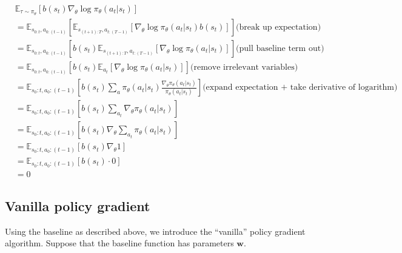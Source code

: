 \documentclass{article}
\newcommand{\E}{\mathbb{E}}                                        %
\newcommand{\w}{\mathbf{w}}
\begin{document}
\begin{align*}
&\E_{\tau \sim \pi_\theta} [b(s_t) \nabla_\theta \log \pi_\theta(a_t | s_t) ] \\
&= \E_{s_{0:t},a_{0:(t-1)}} \left[ \E_{s_{(t+1):T},a_{t:(T-1)}} [ \nabla_\theta \log \pi_\theta(a_t | s_t) b(s_t)] \right] \text{(break up expectation)} \\
&= \E_{s_{0:t},a_{0:(t-1)}} \left[ b(s_t) \E_{s_{(t+1):T},a_{t:(T-1)}} [ \nabla_\theta \log \pi_\theta(a_t | s_t)] \right] \text{(pull baseline term out)} \\
&= \E_{s_{0:t},a_{0:(t-1)}} \left[ b(s_t) \E_{a_t} [ \nabla_\theta \log \pi_\theta(a_t | s_t)] \right] \text{(remove irrelevant variables)} \\
&= \E_{s_0:t,a_0:(t-1)} \left[ b(s_t) \sum_a \pi_\theta(a_t | s_t) \frac{\nabla_\theta \pi_\theta(a_t | s_t)}{\pi_\theta(a_t | s_t)} \right] \text{(expand expectation + take derivative of logarithm)} \\
&= \E_{s_0:t,a_0:(t-1)} \left[ b(s_t) \sum_{a_t} \nabla_\theta \pi_\theta(a_t | s_t) \right] \\
&= \E_{s_0:t,a_0:(t-1)} \left[ b(s_t) \nabla_\theta \sum_{a_t} \pi_\theta(a_t | s_t) \right] \\
&= \E_{s_0:t,a_0:(t-1)} \left[ b(s_t) \nabla_\theta 1 \right] \\
&= \E_{s_0:t,a_0:(t-1)} \left[ b(s_t) \cdot 0 \right] \\
&= 0
\end{align*}

\subsection{Vanilla policy gradient}
Using the baseline as described above, we introduce the ``vanilla'' policy gradient algorithm. Suppose that the baseline function has parameters $\w$.
\end{document}
